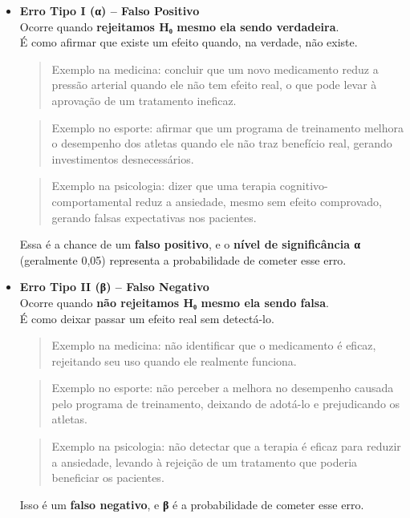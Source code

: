 \documentclass[
]{book}
\begin{document}
\begin{itemize}
\item
  \textbf{Erro Tipo I (α) -- Falso Positivo}\\
  Ocorre quando \textbf{rejeitamos H₀ mesmo ela sendo verdadeira}.\\
  É como afirmar que existe um efeito quando, na verdade, não existe.

  \begin{quote}
  Exemplo na medicina: concluir que um novo medicamento reduz a pressão arterial quando ele não tem efeito real, o que pode levar à aprovação de um tratamento ineficaz.
  \end{quote}

  \begin{quote}
  Exemplo no esporte: afirmar que um programa de treinamento melhora o desempenho dos atletas quando ele não traz benefício real, gerando investimentos desnecessários.
  \end{quote}

  \begin{quote}
  Exemplo na psicologia: dizer que uma terapia cognitivo-comportamental reduz a ansiedade, mesmo sem efeito comprovado, gerando falsas expectativas nos pacientes.
  \end{quote}

  Essa é a chance de um \textbf{falso positivo}, e o \textbf{nível de significância α} (geralmente 0,05) representa a probabilidade de cometer esse erro.
\item
  \textbf{Erro Tipo II (β) -- Falso Negativo}\\
  Ocorre quando \textbf{não rejeitamos H₀ mesmo ela sendo falsa}.\\
  É como deixar passar um efeito real sem detectá-lo.

  \begin{quote}
  Exemplo na medicina: não identificar que o medicamento é eficaz, rejeitando seu uso quando ele realmente funciona.
  \end{quote}

  \begin{quote}
  Exemplo no esporte: não perceber a melhora no desempenho causada pelo programa de treinamento, deixando de adotá-lo e prejudicando os atletas.
  \end{quote}

  \begin{quote}
  Exemplo na psicologia: não detectar que a terapia é eficaz para reduzir a ansiedade, levando à rejeição de um tratamento que poderia beneficiar os pacientes.
  \end{quote}

  Isso é um \textbf{falso negativo}, e \textbf{β} é a probabilidade de cometer esse erro.
\end{itemize}
\end{document}
